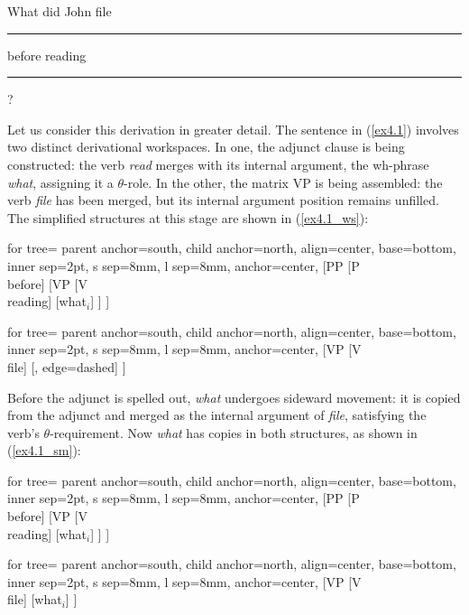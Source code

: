 \documentclass[12pt]{article}
\newcommand{\gap}{\rule{1.25em}{.5pt}} %
\newcommand{\TwoTreeCols}[2]{%
  \noindent\parbox[t]{0.47\linewidth}{#1}%
  \hspace{1.2em}%
  \parbox[t]{0.47\linewidth}{#2}\par
}
\begin{document}
\ex \label{ex4.1}
What did John file \gap{} before reading \gap{}?
\xe

Let us consider this derivation in greater detail. The sentence in (\ref{ex4.1}) involves two distinct derivational workspaces. In one, the adjunct clause is being constructed: the verb \textit{read} merges with its internal argument, the wh-phrase \textit{what}, assigning it a $\theta$-role. In the other, the matrix VP is being assembled: the verb \textit{file} has been merged, but its internal argument position remains unfilled. The simplified structures at this stage are shown in (\ref{ex4.1_ws}):

\ex \label{ex4.1_ws}
\TwoTreeCols{%
\begin{forest}
for tree={
  parent anchor=south,
  child anchor=north,
  align=center,
  base=bottom,
  inner sep=2pt,
  s sep=8mm,
  l sep=8mm,
  anchor=center,
}
[PP
  [P\\before]
  [VP
    [V\\reading]
    [what$_i$]
  ]
]
\end{forest}%
}{%
\begin{forest}
for tree={
  parent anchor=south,
  child anchor=north,
  align=center,
  base=bottom,
  inner sep=2pt,
  s sep=8mm,
  l sep=8mm,
  anchor=center,
}
[VP
  [V\\file]
  [\phantom{what$_i$}, edge={dashed}]
]
\end{forest}%
}
\xe

\noindent
Before the adjunct is spelled out, \textit{what} undergoes sideward movement: it is copied from the adjunct and merged as the internal argument of \textit{file}, satisfying the verb’s $\theta$-requirement. Now \textit{what} has copies in both structures, as shown in (\ref{ex4.1_sm}):

\ex \label{ex4.1_sm}
\TwoTreeCols{%
\begin{forest}
for tree={
  parent anchor=south,
  child anchor=north,
  align=center,
  base=bottom,
  inner sep=2pt,
  s sep=8mm,
  l sep=8mm,
  anchor=center,
}
[PP
  [P\\before]
  [VP
    [V\\reading]
    [what$_i$]
  ]
]
\end{forest}%
}{%
\begin{forest}
for tree={
  parent anchor=south,
  child anchor=north,
  align=center,
  base=bottom,
  inner sep=2pt,
  s sep=8mm,
  l sep=8mm,
  anchor=center,
}
[VP
  [V\\file]
  [what$_i$]
]
\end{forest}%
}
\xe
\end{document}
